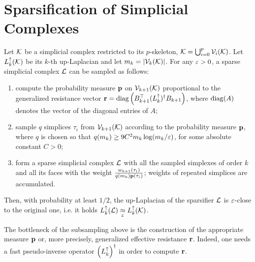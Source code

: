 \chapter{ Sparsification of Simplicial Complexes }
% 
%

\begin{thm} \label{thm:sparsify}
      Let \( \mathcal{K} \) be a simplicial complex restricted to its \(p\)-skeleton, \( \mathcal{K} = \bigcup_{i=0}^p \mathcal{V}_{i}(\mathcal{K}) \).  Let   \( L_{k}^{\uparrow} (\mathcal{K} ) \) be its  \(k\)-th up-Laplacian and let \( m_k = | \mathcal{V}_{k}(\mathcal{K}) | \). For any \( \varepsilon > 0 \), a sparse simplicial complex \( \mathcal{L} \) can be sampled as follows:
      \begin{enumerate}[leftmargin=*, label=(\arabic*)]
            \item compute the probability measure \( \mathbf{p}  \) on \( \mathcal{V}_{k+1}(\mathcal{K}) \) proportional to the generalized resistance vector \( \mathbf{r} = \operatorname{diag} \left( B_{k+1}^\top ( L_{k}^{\uparrow} )^\dagger B_{k+1} \right) \), where  $\operatorname{diag}(A)$ denotes the vector of the diagonal entries of $A$;
            \item sample \(q\) simplices \( \tau_i \) from \( \mathcal{V}_{k+1}(\mathcal{K})\) according to the probability measure \( \mathbf{p}  \),  where $q$ is chosen so that  \( q ( m_k ) \ge 9 C^2 m_{k} \log ( m_{k} / \varepsilon  )\), for some absolute constant  \( C>0 \);
            \item form a sparse simplicial complex \( \mathcal{L} \) with all the sampled simplexes of order \( k \) and all its faces with the weight \( \frac{ w_{k+1} (\tau_i) }{ q(m_k) \mathbf{p}(\tau_i)  } \); weights of repeated simplices are accumulated.
      \end{enumerate}
      Then, with probability at least \(1/2\), the up-Laplacian of the sparsifier \( \mathcal{L} \) is \(\varepsilon\)-close to the original one, i.e. it holds \( L_{k}^{\uparrow} (\mathcal{L} ) \underset{\varepsilon}{\approx} L_{k}^{\uparrow} (\mathcal{K}) \).
\end{thm}

The bottleneck of the subsampling above is the construction of the appropriate measure \( \mathbf{p} \) or, more precisely, generalized effective resistance \( \mathbf{r} \). Indeed, one needs a fast pseudo-inverse operator \( \left(  L_{k}^{\uparrow} \right)^\dagger \) in order to compute \( \mathbf{r} \).




